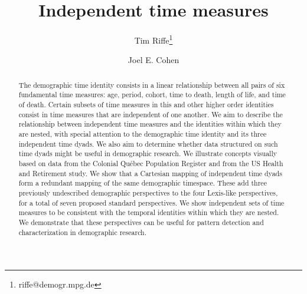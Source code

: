 


\title{Independent time measures}

\author[1]{Tim Riffe\thanks{riffe@demogr.mpg.de}}
\author[2, 3]{Joel E. Cohen}




\maketitle

\vspace{-2em}
\begin{abstract}
 The demographic time identity consists in a linear relationship between all pairs of six fundamental time measures: age, period, cohort, time to death, length of life, and time of death. Certain subsets of time measures in this and other higher order identities consist in time measures that are independent of one another.
 We aim to describe the relationship between
independent time measures and the identities within which they are nested, with special attention to the demographic time identity and its three independent time dyads. We also aim to determine whether data structured on such time dyads might be useful in demographic research.
 We illustrate concepts visually based on data from the Colonial Qu\'{e}bec Population Register and from the US Health and Retirement study.
  We show that a Cartesian mapping of independent time dyads form a redundant mapping of the same demographic timespace. These add three previously undescribed demographic perspectives to the four Lexis-like perspectives, for a total of seven proposed standard perspectives. 
 We show independent sets of time measures to be consistent with the temporal identities within which they are nested. We demonstrate that these perspectives can be useful for pattern detection and characterization in demographic research.
\end{abstract}

